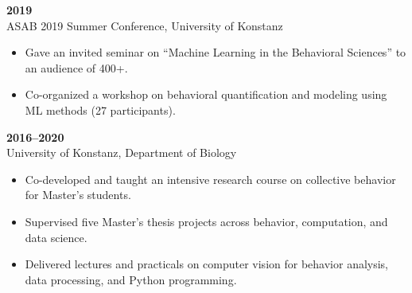 \documentclass[10pt,letterpaper]{article}
\begin{document}
	\vspace{4pt}
	\textbf{2019}\\
	ASAB 2019 Summer Conference, University of Konstanz
	\begin{itemize}
		\item Gave an invited seminar on “Machine Learning in the Behavioral Sciences” to an audience of 400+.
		\item Co-organized a workshop on behavioral quantification and modeling using ML methods (27 participants).
	\end{itemize}
	
	\vspace{4pt}
	\textbf{2016--2020}\\
	University of Konstanz, Department of Biology
	\begin{itemize}
		\item Co-developed and taught an intensive research course on collective behavior for Master’s students.
		\item Supervised five Master’s thesis projects across behavior, computation, and data science.
		\item Delivered lectures and practicals on computer vision for behavior analysis, data processing, and Python programming.
	\end{itemize}
	
	
	
	
	
	
\end{document}
